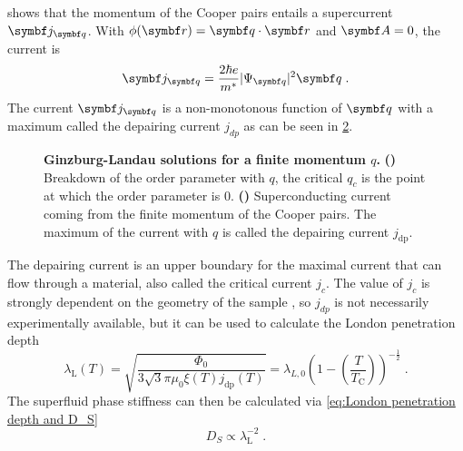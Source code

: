 \documentclass[../main.tex]{subfiles}
\begin{document}
 shows that the momentum of the Cooper pairs entails a supercurrent \(\vb{j}_{\vb{q}}\).
With \(\phi(\vb{r}) = \vb{q} \cdot \vb{r}\) and \(\vb{A} = 0\), the current is
\begin{equation}
	\vb{j}_{\vb{q}} = \frac{2 \hbar e}{m^*} \vert \Psi_{\vb{q}} \vert^2 \vb{q} \;.
\end{equation}
The current \(\vb{j}_{\vb{q}}\) is a non-monotonous function of \(\vb{q}\) with a maximum called the depairing current \(j_{dp}\) as can be seen in \cref{sfig:Ginzburg Landau current vs q}.
\begin{figure}[t]
	\centering
	\begin{subfigure}[b]{0.49\textwidth}
		\centering
		\caption{\hfill\null}\label{sfig:Ginzburg Landau OP vs q}
		
	\end{subfigure}%
	\begin{subfigure}[b]{0.49\textwidth}
		\centering
		\caption{\hfill\null}\label{sfig:Ginzburg Landau current vs q}
		
	\end{subfigure}
	\caption[Ginzburg-Landau solutions for a finite momentum \(q\).]{\textbf{Ginzburg-Landau solutions for a finite momentum \(q\).} \textbf{()} Breakdown of the order parameter with \(q\), the critical \(q_c\) is the point at which the order parameter is 0. \textbf{()} Superconducting current coming from the finite momentum of the Cooper pairs. The maximum of the current with \(q\) is called the depairing current \(j_{\mathrm{dp}}\).}
	\label{fig:Ginzburg Landau OP and current vs q}
\end{figure}
The depairing current is an upper boundary for the maximal current that can flow through a material, also called the critical current \(j_c\).
The value of \(j_c\) is strongly dependent on the geometry of the sample \cite{bardeenCriticalFieldsCurrents1962, xuAchievingTheoreticalDepairing2010}, so \(j_{dp}\) is not necessarily experimentally available, but it can be used to calculate the London penetration depth \cite{tinkhamIntroductionSuperconductivity1996}
\begin{equation}
	\lambda_{\mathrm{L}} (T) = \sqrt{\frac{\Phi_0}{3 \sqrt{3} \pi \mu_0 \xi(T) j_{\mathrm{dp}} (T)}} = \lambda_{L,0} \left( 1 - \left( \frac{T}{T_{\mathrm{C}}}\right) \right)^{-\frac{1}{2}}\;.
\end{equation}
The superfluid phase stiffness can then be calculated via \cref{eq:London penetration depth and D_S}
\begin{equation}
	D_S \propto \lambda_{\mathrm{L}}^{-2} \;.
\end{equation}
\end{document}
